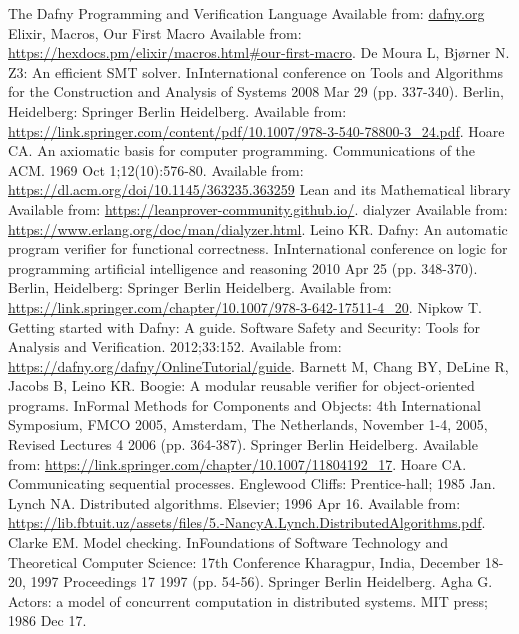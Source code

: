 \begin{thebibliography}{9}
The Dafny Programming and Verification Language
Available from: \url{dafny.org}
Elixir, Macros, Our First Macro
Available from: \url{https://hexdocs.pm/elixir/macros.html#our-first-macro}.
De Moura L, Bjørner N. Z3: An efficient SMT solver. InInternational conference on Tools and Algorithms for the Construction and Analysis of Systems 2008 Mar 29 (pp. 337-340). Berlin, Heidelberg: Springer Berlin Heidelberg.
Available from: \url{https://link.springer.com/content/pdf/10.1007/978-3-540-78800-3_24.pdf}.
Hoare CA. An axiomatic basis for computer programming. Communications of the ACM. 1969 Oct 1;12(10):576-80.
Available from: \url{https://dl.acm.org/doi/10.1145/363235.363259}
Lean and its Mathematical library
Available from: \url{https://leanprover-community.github.io/}.
dialyzer
Available from: \url{https://www.erlang.org/doc/man/dialyzer.html}.
Leino KR. Dafny: An automatic program verifier for functional correctness. InInternational conference on logic for programming artificial intelligence and reasoning 2010 Apr 25 (pp. 348-370). Berlin, Heidelberg: Springer Berlin Heidelberg.
Available from: \url{https://link.springer.com/chapter/10.1007/978-3-642-17511-4_20}.
Nipkow T. Getting started with Dafny: A guide. Software Safety and Security: Tools for Analysis and Verification. 2012;33:152.
Available from: \url{https://dafny.org/dafny/OnlineTutorial/guide}.
Barnett M, Chang BY, DeLine R, Jacobs B, Leino KR. Boogie: A modular reusable verifier for object-oriented programs. InFormal Methods for Components and Objects: 4th International Symposium, FMCO 2005, Amsterdam, The Netherlands, November 1-4, 2005, Revised Lectures 4 2006 (pp. 364-387). Springer Berlin Heidelberg.
Available from: \url{https://link.springer.com/chapter/10.1007/11804192_17}.
Hoare CA. Communicating sequential processes. Englewood Cliffs: Prentice-hall; 1985 Jan.
Lynch NA. Distributed algorithms. Elsevier; 1996 Apr 16.
Available from: \url{https://lib.fbtuit.uz/assets/files/5.-NancyA.Lynch.DistributedAlgorithms.pdf}.
Clarke EM. Model checking. InFoundations of Software Technology and Theoretical Computer Science: 17th Conference Kharagpur, India, December 18-20, 1997 Proceedings 17 1997 (pp. 54-56). Springer Berlin Heidelberg.
Agha G. Actors: a model of concurrent computation in distributed systems. MIT press; 1986 Dec 17.

\end{thebibliography}
